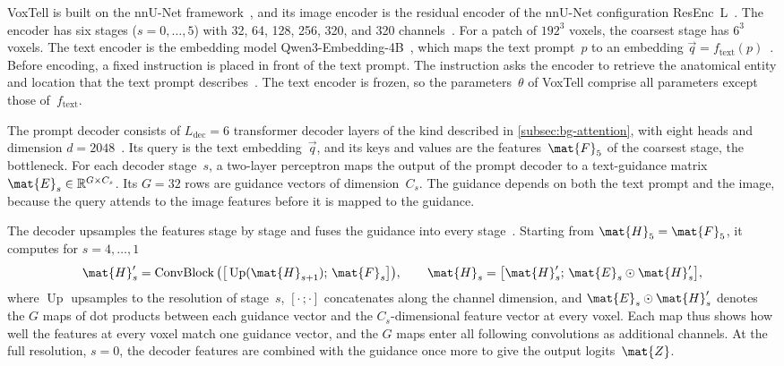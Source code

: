 VoxTell is built on the nnU-Net framework~\cite[Suppl.~Sec.~A]{rokuss2025voxtellfreetextpromptableuniversal}, and its image encoder is the residual encoder of the nnU-Net configuration ResEnc~L~\cite[Sec.~3.1]{isensee2024nnunetrevisited}.
The encoder has six stages ($s = 0, \dots, 5$) with 32, 64, 128, 256, 320, and 320 channels~\cite[Suppl.~Sec.~A.2]{rokuss2025voxtellfreetextpromptableuniversal}.
For a patch of $192^3$ voxels, the coarsest stage has $6^3$ voxels.
The text encoder is the embedding model Qwen3-Embedding-4B~\cite{zhang2025qwen3embedding}, which maps the text prompt~$p$ to an embedding $\vec{q} = f_{\mathrm{text}}(p)$~\cite[Eq.~2]{rokuss2025voxtellfreetextpromptableuniversal}.
Before encoding, a fixed instruction is placed in front of the text prompt.
The instruction asks the encoder to retrieve the anatomical entity and location that the text prompt describes~\cite[Suppl.~Sec.~A.2]{rokuss2025voxtellfreetextpromptableuniversal}.
The text encoder is frozen, so the parameters~$\theta$ of VoxTell comprise all parameters except those of~$f_{\mathrm{text}}$.

The prompt decoder consists of $L_{\mathrm{dec}} = 6$ transformer decoder layers of the kind described in \cref{subsec:bg-attention}, with eight heads and dimension $d = 2048$~\cite[Sec.~3, Eq.~3, Suppl.~Sec.~A.2]{rokuss2025voxtellfreetextpromptableuniversal}.
Its query is the text embedding~$\vec{q}$, and its keys and values are the features~$\mat{F}_5$ of the coarsest stage, the bottleneck.
For each decoder stage~$s$, a two-layer perceptron maps the output of the prompt decoder to a text-guidance matrix $\mat{E}_s \in \mathbb{R}^{G \times C_s}$.
Its $G = 32$ rows are guidance vectors of dimension~$C_s$.
The guidance depends on both the text prompt and the image, because the query attends to the image features before it is mapped to the guidance.

The decoder upsamples the features stage by stage and fuses the guidance into every stage~\cite[Eqs.~4--6]{rokuss2025voxtellfreetextpromptableuniversal}.
Starting from $\mat{H}_5 = \mat{F}_5$, it computes for $s = 4, \dots, 1$
\begin{equation}
\mat{H}'_s = \operatorname{ConvBlock}\big(\big[\operatorname{Up}(\mat{H}_{s+1});\, \mat{F}_s\big]\big),
\qquad
\mat{H}_s = \big[\mat{H}'_s;\, \mat{E}_s \odot \mat{H}'_s\big],
\label{eq:bg-voxtell-fusion}
\end{equation}
where $\operatorname{Up}$ upsamples to the resolution of stage~$s$, $[\cdot\,;\cdot]$ concatenates along the channel dimension, and $\mat{E}_s \odot \mat{H}'_s$ denotes the $G$ maps of dot products between each guidance vector and the $C_s$-dimensional feature vector at every voxel.
Each map thus shows how well the features at every voxel match one guidance vector, and the $G$ maps enter all following convolutions as additional channels.
At the full resolution, $s = 0$, the decoder features are combined with the guidance once more to give the output logits~$\mat{Z}$.

